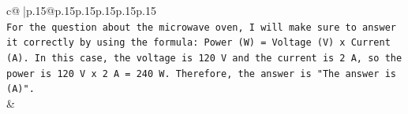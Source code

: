 \documentclass{article}
\begin{document}
{\begin{supertabular}{c@{$\;$}|p{.15\linewidth}@{}p{.15\linewidth}p{.15\linewidth}p{.15\linewidth}p{.15\linewidth}p{.15\linewidth}}
{{{\\ 
\texttt{For the question about the microwave oven, I will make sure to answer it correctly by using the formula: Power (W) = Voltage (V) x Current (A). In this case, the voltage is 120 V and the current is 2 A, so the power is 120 V x 2 A = 240 W. Therefore, the answer is "The answer is (A)".} \\
            }
        }
    }
    & \\ \\

\end{supertabular}
}
\end{document}
